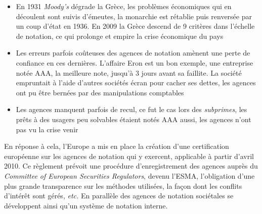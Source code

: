 \documentclass[main.tex]{subfiles}
\begin{document}
\begin{itemize}
        \item En 1931 \emph{Moody's} dégrade la Grèce, les problèmes économiques qui en découlent sont suivis d'émeutes, la monarchie est rétablie puis renversée par un coup d'état en 1936. En 2009 la Grèce descend de 9 critères dans l'échelle de notation, ce qui prolonge et empire la crise économique du pays
        \item Les erreurs parfois coûteuses des agences de notation amènent une perte de confiance en ces dernières. L'affaire Eron est un bon exemple, une entreprise notée AAA, la meilleure note, jusqu'à 3 jours avant sa faillite. La société empruntait à l'aide d'autres sociétés écran pour cacher ses dettes, les agences ont pu être bernées par des manipulations comptables
        \item Les agences manquent parfois de recul, ce fut le cas lors des \emph{subprimes}, les prêts à des usagers peu solvables étaient notés AAA aussi, les agences n'ont pas vu la crise venir
\end{itemize}

En réponse à cela, l'Europe a mis en place la création d'une certification européenne sur les agences de notation qui y exercent, applicable à partir d'avril 2010. Ce règlement prévoit une procédure d'enregistrement des agences auprès du \emph{Committee of European Securities Regulators}, devenu l'ESMA, l'obligation d'une plus grande transparence sur les méthodes utilisées, la façon dont les conflits d'intérêt sont gérés, \textit{etc.} En parallèle des agences de notation sociétales se développent ainsi qu'un système de notation interne.
\end{document}
